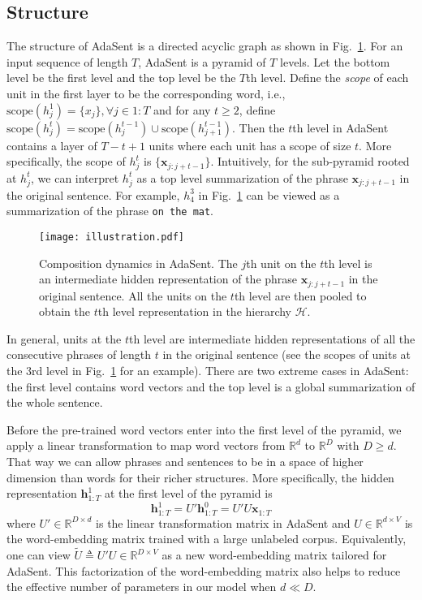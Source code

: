 \documentclass{article}
\newcommand{\RR}{\mathbb{R}}
\theoremstyle{definition}
\begin{document}
\subsection{Structure}
The structure of AdaSent is a directed acyclic graph as shown in Fig.~\ref{fig:illustration}. For an input sequence of length $T$, AdaSent is a pyramid of $T$ levels. Let the bottom level be the first level and the top level be the $T$th level. Define the \emph{scope} of each unit in the first layer to be the corresponding word, i.e., $\text{scope}(h^1_j) = \{x_j\}, \forall j\in 1:T$ and for any $t\geq 2$, define $\text{scope}(h^t_j) = \text{scope}(h^{t-1}_j)\cup\text{scope}(h^{t-1}_{j+1})$. Then the $t$th level in AdaSent contains a layer of $T-t+1$ units where each unit has a scope of size $t$. More specifically, the scope of $h^t_j$ is $\{\mathbf{x}_{j:j+t-1}\}$. Intuitively, for the sub-pyramid rooted at $h^t_j$, we can interpret $h^t_j$ as a top level summarization of the phrase $\mathbf{x}_{j:j+t-1}$ in the original sentence. For example, $h^3_4$ in Fig.~\ref{fig:illustration} can be viewed as a summarization of the phrase \texttt{on the mat}.
\begin{figure}[htb]
\centering
	\texttt{[image: illustration.pdf]}
\caption{Composition dynamics in AdaSent. The $j$th unit on the $t$th level is an intermediate hidden representation of the phrase $\mathbf{x}_{j:j+t-1}$ in the original sentence. All the units on the $t$th level are then pooled to obtain the $t$th level representation in the hierarchy $\mathcal{H}$.}
\label{fig:illustration}
\end{figure}

In general, units at the $t$th level are intermediate hidden representations of all the consecutive phrases of length $t$ in the original sentence (see the scopes of units at the 3rd level in Fig.~\ref{fig:illustration} for an example). There are two extreme cases in AdaSent: the first level contains word vectors and the top level is a global summarization of the whole sentence.

Before the pre-trained word vectors enter into the first level of the pyramid, we apply a linear transformation to map word vectors from $\RR^d$ to $\RR^D$ with $D\geq d$. That way we can allow phrases and sentences to be in a space of higher dimension than words for their richer structures.
More specifically, the hidden representation $\mathbf{h}^1_{1:T}$ at the first level of the pyramid is
\begin{equation}
\mathbf{h}^1_{1:T} = U'\mathbf{h}^0_{1:T} = U'U\mathbf{x}_{1:T}
\end{equation}
where $U'\in\RR^{D\times d}$ is the linear transformation matrix in AdaSent and $U\in\RR^{d\times V}$ is the word-embedding matrix trained with a large unlabeled corpus. Equivalently, one can view $\widetilde{U}\triangleq U'U\in\RR^{D\times V}$ as a new word-embedding matrix tailored for AdaSent. This factorization of the word-embedding matrix also helps to reduce the effective number of parameters in our model when $d\ll D$.
\end{document}
